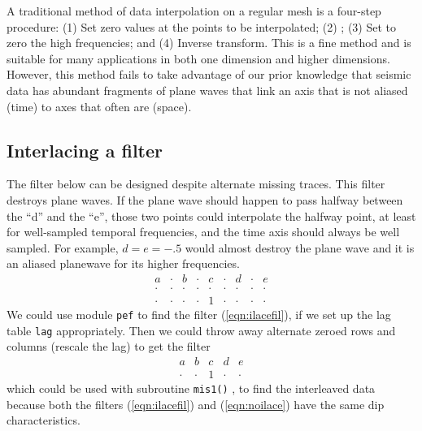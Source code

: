 A traditional method of data interpolation on a regular mesh
is a four-step procedure:
(1) Set zero values at the points to be interpolated;
(2) ;
(3) Set to zero the high frequencies;
and
(4) Inverse transform.
This is a fine method and is suitable for many applications
in both one dimension and higher dimensions.
However,
this method fails to take advantage of our prior knowledge
that seismic data has abundant fragments of plane waves
that link an axis that is not aliased (time)
to axes that often are (space).

\subsection{Interlacing a filter}
The filter below can
be designed despite alternate missing traces.
This filter destroys plane waves.
If the plane wave should happen to pass halfway between
the ``d'' and the ``e'',
those two points could interpolate the halfway point,
at least for well-sampled temporal frequencies,
and the time axis should always be well sampled.
For example, $d=e=-.5$ would almost destroy the plane wave
and it is an aliased planewave for its higher frequencies.
\begin{equation}
   \begin{array}{ccccccccc}
      a     &\cdot &b     &\cdot &c     &\cdot &d     &\cdot &e     \\
      \cdot &\cdot &\cdot &\cdot &\cdot &\cdot &\cdot &\cdot &\cdot \\
      \cdot &\cdot &\cdot &\cdot &1     &\cdot &\cdot &\cdot &\cdot \end{array}
\label{eqn:ilacefil}
\end{equation}
We could
use module \texttt{pef} 
to find the filter (\ref{eqn:ilacefil}),
if we set up the 
lag table \texttt{lag}
appropriately.
Then we could throw away alternate zeroed rows and columns (rescale the lag) to get the filter
\begin{equation}
   \begin{array}{ccccc}
      a     &b     &c     &d     &e     \\
      \cdot &\cdot &1     &\cdot &\cdot \end{array}
\label{eqn:noilace}
\end{equation}
which could be used with subroutine \texttt{mis1()} ,
to find the interleaved data
because both
the filters (\ref{eqn:ilacefil}) and (\ref{eqn:noilace})
have the same dip characteristics.

